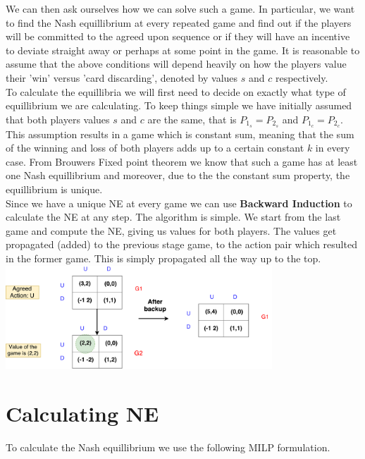 \documentclass[11pt]{article}
\begin{document}
\vspace{2mm}
We can then ask ourselves how we can solve such a game. In particular, we want to find the Nash equillibrium at every repeated game and find out if the players will be committed to the agreed upon sequence or if they will have an incentive to deviate straight away or perhaps at some point in the game. It is reasonable to assume that the above conditions will depend heavily on how the players value their 'win' versus 'card discarding', denoted by values $s$ and $c$ respectively. \\
To calculate the equillibria we will first need to decide on exactly what type of equillibrium we are calculating. 
To keep things simple we have initially assumed that both players values $s$ and $c$ are the same, that is $P_{1_s} = P_{2_s}$ and
$P_{1_c} = P_{2_c}$. This assumption results in a game which is constant sum, meaning that the sum of the winning and loss of both players adds up to a certain constant $k$ in every case. From Brouwers Fixed point theorem we know that such a game has at least one Nash equillibrium and moreover, due to the the constant sum property, the equillibrium is unique. \\

\vspace{2mm}
Since we have a unique NE at every game we can use \textbf{Backward Induction}  to calculate the NE at any step.
The algorithm is simple. We start from the last game and compute the NE, giving us values for both players. The values get propagated (added) to the previous stage game, to the action pair which resulted in the former game. This is simply propagated all the way up to the top. \\

\includegraphics[width=10cm]{prop} \\

\section{Calculating NE}
To calculate the Nash equillibrium we use the following MILP formulation. 
\end{document}
